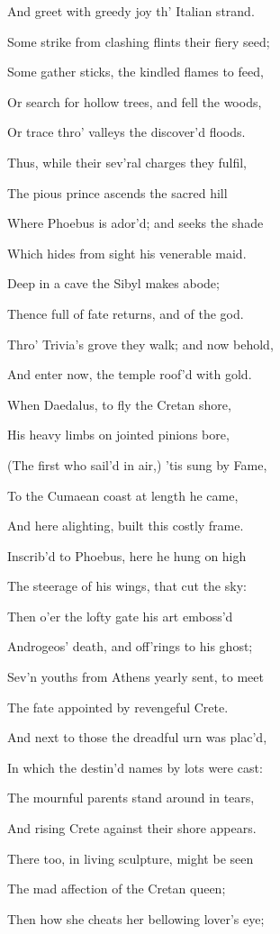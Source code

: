 And greet with greedy joy th’ Italian strand.

Some strike from clashing flints their fiery seed;

Some gather sticks, the kindled flames to feed,

Or search for hollow trees, and fell the woods,

Or trace thro’ valleys the discover’d floods.

Thus, while their sev’ral charges they fulfil,

The pious prince ascends the sacred hill

Where Phoebus is ador’d; and seeks the shade

Which hides from sight his venerable maid.

Deep in a cave the Sibyl makes abode;

Thence full of fate returns, and of the god.

Thro’ Trivia’s grove they walk; and now behold,

And enter now, the temple roof’d with gold.

When Daedalus, to fly the Cretan shore,

His heavy limbs on jointed pinions bore,

(The first who sail’d in air,) ’tis sung by Fame,

To the Cumaean coast at length he came,

And here alighting, built this costly frame.

Inscrib’d to Phoebus, here he hung on high

The steerage of his wings, that cut the sky:

Then o’er the lofty gate his art emboss’d

Androgeos’ death, and off’rings to his ghost;

Sev’n youths from Athens yearly sent, to meet

The fate appointed by revengeful Crete.

And next to those the dreadful urn was plac’d,

In which the destin’d names by lots were cast:

The mournful parents stand around in tears,

And rising Crete against their shore appears.

There too, in living sculpture, might be seen

The mad affection of the Cretan queen;

Then how she cheats her bellowing lover’s eye;

